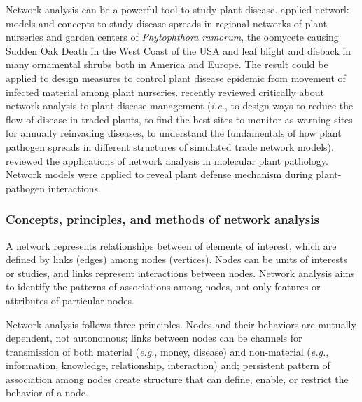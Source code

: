 Network analysis can be a powerful tool to study plant disease. \citet{Lefebvre:2011fo,Jeger:2007tn} applied network models and concepts to study disease spreads in regional networks of plant nurseries and garden centers of \textit{Phytophthora ramorum}, the oomycete causing Sudden Oak Death in the West Coast of the USA and leaf blight and dieback in many ornamental shrubs both in America and Europe. The result could be applied to design measures to control plant disease epidemic from movement of infected material among plant nurseries. 
\citet{Shaw:2014cka} recently reviewed critically about network analysis to plant disease management (\textit{i.e.}, to design ways to reduce the flow of disease in traded plants, to find the best sites to monitor as warning sites for annually reinvading diseases, to understand the fundamentals of how plant pathogen spreads in different structures of simulated trade network models). \citet{windram2014network} reviewed the applications of network analysis in molecular plant pathology. Network models were applied to reveal plant defense mechanism during plant-pathogen interactions.

\subsubsection*{Concepts, principles, and methods of network analysis}

A network represents relationships between of elements of interest, which are defined by links (edges) among nodes (vertices). Nodes can be units of interests or studies, and links represent interactions between nodes. Network analysis aims to identify the patterns of associations among nodes, not only features or attributes of particular nodes.

Network analysis follows three principles. Nodes and their behaviors are mutually dependent, not autonomous; links between nodes can be channels for transmission of both material (\textit{e.g.}, money, disease) and non-material (\textit{e.g.}, information, knowledge, relationship, interaction) and; persistent pattern of association among nodes create structure that can define, enable, or restrict the behavior of a node.


